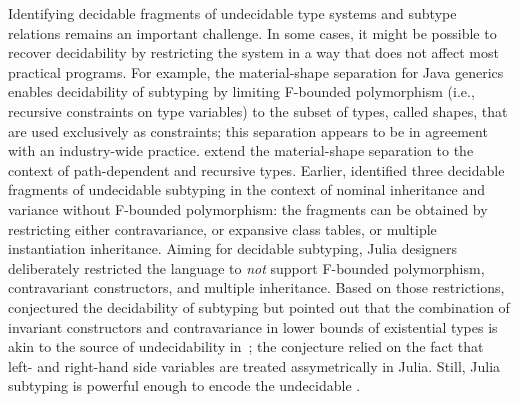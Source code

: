 Identifying decidable fragments of undecidable type systems and subtype
relations remains an important challenge.
In some cases, it might be possible to recover
decidability by restricting the system in a way that does not affect most
practical programs. For example, the material-shape separation for Java
generics~\cite{bib:greenman:f-bound-material-shape:2014}
enables decidability of subtyping by limiting F-bounded polymorphism %
(i.e., recursive constraints on type variables)
to the subset of types, called shapes, that are used exclusively as constraints;
this separation appears to be in agreement with an industry-wide practice.
\citet{bib:mackay:path-dep-dec:2020} extend the material-shape separation
to the context of path-dependent and recursive types. %
Earlier, \citet{bib:kennedy:nom-sub-var-dec:2007} identified three decidable
fragments of undecidable subtyping in the context of nominal inheritance
and variance without F-bounded polymorphism: the fragments can be obtained by
restricting either contravariance, or expansive class tables,
or multiple instantiation inheritance.
Aiming for decidable subtyping, Julia designers deliberately restricted
the language to \emph{not} support F-bounded polymorphism, 
contravariant constructors, and multiple inheritance.
Based on those restrictions, \citet{bib:bezanson:julia:2015} conjectured
the decidability of subtyping but pointed out that
the combination of invariant constructors
and contravariance in lower bounds of existential types
is akin to the source of undecidability in~\FSub;
the conjecture relied on the fact that left- and right-hand side variables
are treated assymetrically in Julia.
Still, Julia subtyping is powerful enough to encode
the undecidable \FSub.

